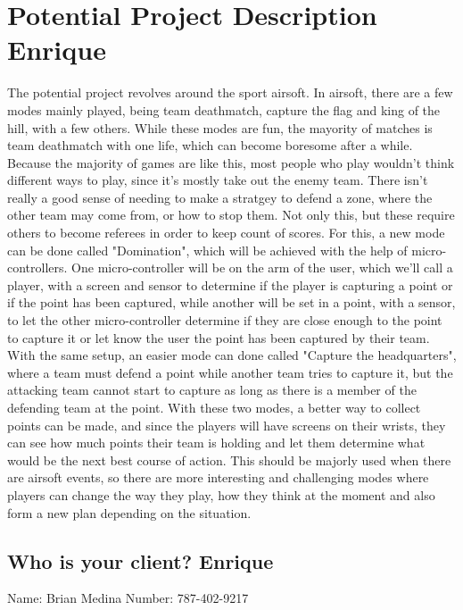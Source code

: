 \chapter{Potential Project Description Enrique}
The potential project revolves around the sport airsoft. In airsoft, there are a few modes mainly played, being team deathmatch, capture the flag and king of the hill, with a few others. While these modes are fun, the mayority of matches is team deathmatch with one life, which can become boresome after a while. Because the majority of games are like this, most people who play wouldn't think different ways to play, since it's mostly take out the enemy team. There isn't really a good sense of needing to make a stratgey to defend a zone, where the other team may come from, or how to stop them. Not only this, but these require others to become referees in order to keep count of scores. For this, a new mode can be done called "Domination", which will be achieved with the help of micro-controllers. One micro-controller will be on the arm of the user, which we'll call a player, with a screen and sensor to determine if the player is capturing a point or if the point has been captured, while another will be set in a point, with a sensor, to let the other micro-controller determine if they are close enough to the point to capture it or let know the user the point has been captured by their team. With the same setup, an easier mode can done called "Capture the headquarters", where a team must defend a point while another team tries to capture it, but the attacking team cannot start to capture as long as there is a member of the defending team at the point. With these two modes, a better way to collect points can be made, and since the players will have screens on their wrists, they can see how much points their team is holding and let them determine what would be the next best course of action. This should be majorly used when there are airsoft events, so there are more interesting and challenging modes where players can change the way they play, how they think at the moment and also form a new plan depending on the situation.
\newpage
\section{Who is your client? Enrique}
Name: Brian Medina
Number: 787-402-9217
